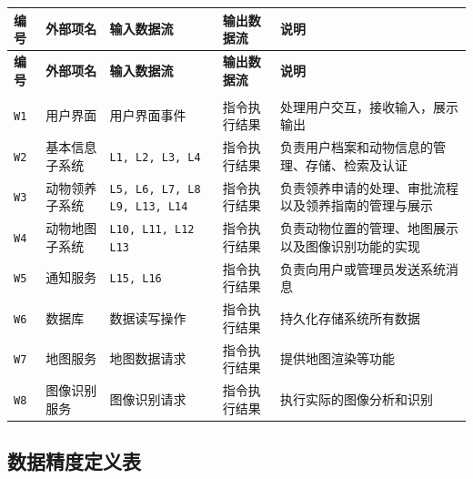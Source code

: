 \documentclass[12pt,a4paper,UTF8]{article}
\begin{document}
\begin{xltabular}{\linewidth}{
  |>{\centering\arraybackslash}m{1cm}
  |>{\centering\arraybackslash}m{3cm}
  |>{\centering\arraybackslash}m{3.5cm}
  |>{\centering\arraybackslash}m{3cm}
  |>{\centering\arraybackslash}m{4.5cm}|}
  \hline
  \textbf{编号} & \textbf{外部项名} & \textbf{输入数据流} & \textbf{输出数据流} & \textbf{说明} \\ \hline \endfirsthead
  \hline
  \textbf{编号} & \textbf{外部项名} & \textbf{输入数据流} & \textbf{输出数据流} & \textbf{说明} \\ \hline \endhead
  \hline
   \\ \endfoot
  \hline \endlastfoot

  \verb|W1| & 用户界面 & 用户界面事件 & 指令执行结果 & 处理用户交互，接收输入，展示输出 \\ \hline
  \verb|W2| & 基本信息子系统 & \verb|L1, L2, L3, L4| & 指令执行结果 & 负责用户档案和动物信息的管理、存储、检索及认证 \\ \hline
  \verb|W3| & 动物领养子系统 & \verb|L5, L6, L7, L8| \verb|L9, L13, L14| & 指令执行结果 & 负责领养申请的处理、审批流程以及领养指南的管理与展示 \\ \hline
  \verb|W4| & 动物地图子系统 & \verb|L10, L11, L12| \verb|L13| & 指令执行结果 & 负责动物位置的管理、地图展示以及图像识别功能的实现 \\ \hline
  \verb|W5| & 通知服务 & \verb|L15, L16| & 指令执行结果 & 负责向用户或管理员发送系统消息 \\ \hline
  \verb|W6| & 数据库 & 数据读写操作 & 指令执行结果 & 持久化存储系统所有数据 \\ \hline
  \verb|W7| & 地图服务 & 地图数据请求 & 指令执行结果 & 提供地图渲染等功能 \\ \hline
  \verb|W8| & 图像识别服务 & 图像识别请求 & 指令执行结果 & 执行实际的图像分析和识别 \\ \hline
\end{xltabular}


\subsection{数据精度定义表}
\end{document}
